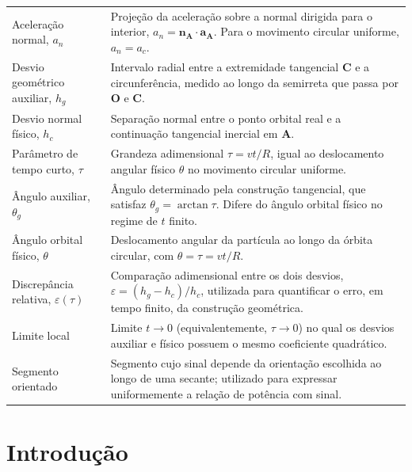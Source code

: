 \documentclass[12pt,a4paper]{article}
\newcommand{\pt}[1]{\mathbf{#1}}
\numberwithin{equation}{section}
\theoremstyle{remark}
\begin{document}
\begin{longtable}{@{}>{\raggedright\arraybackslash}p{}>{\raggedright\arraybackslash}p{}@{}}
Aceleração normal, $a_n$ &
Projeção da aceleração sobre a normal dirigida para o interior, $a_n=\mathbf{n}_{\pt{A}}\!\cdot\!\mathbf{a}_{\pt{A}}$. Para o movimento circular uniforme, $a_n=a_c$. \\
\addlinespace[11pt]

Desvio geométrico auxiliar, $h_g$ &
Intervalo radial entre a extremidade tangencial $\pt{C}$ e a circunferência, medido ao longo da semirreta que passa por $\pt{O}$ e $\pt{C}$. \\
\addlinespace[11pt]

Desvio normal físico, $h_c$ &
Separação normal entre o ponto orbital real e a continuação tangencial inercial em $\pt{A}$. \\
\addlinespace[11pt]

Parâmetro de tempo curto, $\tau$ &
Grandeza adimensional $\tau=vt/R$, igual ao deslocamento angular físico $\theta$ no movimento circular uniforme. \\
\addlinespace[11pt]

Ângulo auxiliar, $\theta_g$ &
Ângulo determinado pela construção tangencial, que satisfaz $\theta_g=\arctan\tau$. Difere do ângulo orbital físico no regime de $t$ finito. \\
\addlinespace[11pt]

Ângulo orbital físico, $\theta$ &
Deslocamento angular da partícula ao longo da órbita circular, com $\theta=\tau=vt/R$. \\
\addlinespace[11pt]

Discrepância relativa, $\varepsilon(\tau)$ &
Comparação adimensional entre os dois desvios, $\varepsilon=(h_g-h_c)/h_c$, utilizada para quantificar o erro, em tempo finito, da construção geométrica. \\
\addlinespace[11pt]

Limite local &
Limite $t\to0$ (equivalentemente, $\tau\to0$) no qual os desvios auxiliar e físico possuem o mesmo coeficiente quadrático. \\
\addlinespace[11pt]

Segmento orientado &
Segmento cujo sinal depende da orientação escolhida ao longo de uma secante; utilizado para expressar uniformemente a relação de potência com sinal. \\

\bottomrule
\end{longtable}
\endgroup

\clearpage
\thispagestyle{plain}

\section{Introdução}
\end{document}
